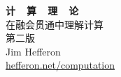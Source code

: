 \begin{titlepage}
\begin{center}
  {\huge\rmfamily\bfseries 计~~算~~理~~论} \\[2.75ex]
  {\Large\rmfamily 在融会贯通中理解计算} \\[2.5ex]
  {\large\sffamily\mdseries 第二版} \\[7.5ex]
  {\large    Jim Hef{}feron}           \\[1.25ex]
  {   \url{hefferon.net/computation}}           \\
\end{center}
\end{titlepage}


